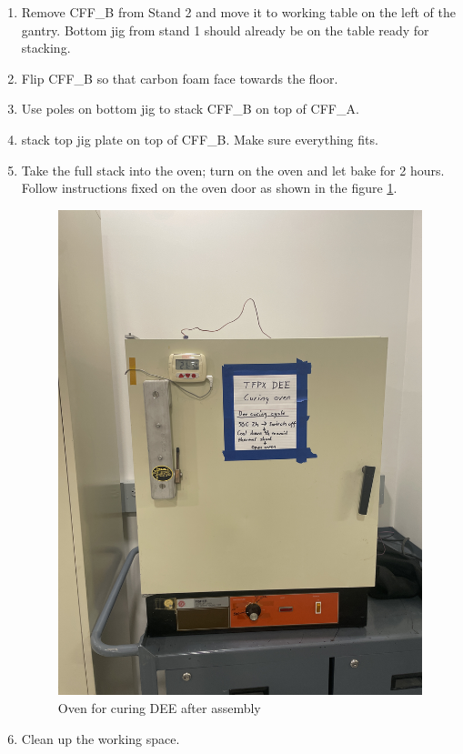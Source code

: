\documentclass[12pt]{cornelltfpxsop}
\begin{document}
\begin{paracol}{2}
\begin{enumerate}
        \item Remove CFF\_B from Stand 2 and move it to working table on the left of the gantry. Bottom jig from stand 1 should already be on the table ready for stacking. 
        \item Flip CFF\_B so that carbon foam face towards the floor.
        \item Use poles on bottom jig to stack CFF\_B on top of CFF\_A.
        \item stack top jig plate on top of CFF\_B. Make sure everything fits.
        \item Take the full stack into the oven; turn on the oven and let bake for 2 hours. Follow instructions fixed on the oven door as shown in the figure \ref{oven}. 
        \begin{figure}
            \centering
            \includegraphics[width=0.9\linewidth, angle=-90]{img/oven.JPG}
            \caption{Oven for curing DEE after assembly}
            \label{oven}
        \end{figure}
        \item Clean up the working space.
\end{enumerate}
\switchcolumn %

\end{paracol}
\end{document}
